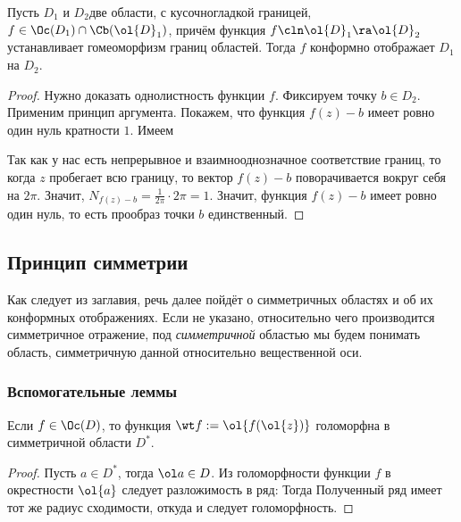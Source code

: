 \documentclass[a4paper]{article}
\begin{document}
\begin{theorem}
Пусть $D_1$ и $D_2$\т две области, с кусочно\д гладкой границей, $f\in\Oc(D_1) \cap \Cb(\ol{D}_1)$,
причём функция $f\cln \ol{D}_1\ra \ol{D}_2$ устанавливает гомеоморфизм границ областей.
Тогда $f$ конформно отображает $D_1$ на $D_2$.
\end{theorem}
\begin{proof}
Нужно доказать однолистность функции $f$. Фиксируем точку $b \in D_2$.
Применим принцип аргумента. Покажем, что функция $f(z)-b$ имеет ровно один нуль кратности $1$. Имеем


Так как у нас есть непрерывное и взаимно\д однозначное соответствие границ, то когда $z$ пробегает всю границу, то
вектор $f(z)-b$ поворачивается вокруг себя на $2\pi$. Значит, $N_{f(z)-b} = \frac{1}{2\pi} \cdot2\pi =1$.
Значит, функция $f(z)-b$ имеет ровно один нуль, то есть прообраз точки $b$ единственный.
\end{proof}

\subsection{Принцип симметрии}

Как следует из заглавия, речь далее пойдёт о симметричных областях и об их конформных отображениях.
Если не указано, относительно чего производится симметричное отражение, под \emph{симметричной}
областью мы будем понимать область, симметричную данной относительно вещественной оси.

\subsubsection{Вспомогательные леммы}

\begin{lemma}
Если $f\in\Oc(D)$, то функция $\wt f := \ol{f(\ol{z})}$ голоморфна в симметричной области $D^*$.
\end{lemma}
\begin{proof}
Пусть $a \in D^*$, тогда $\ol a \in D$. Из голоморфности функции $f$ в окрестности $\ol{a}$ следует
разложимость в ряд:
Тогда
Полученный ряд имеет тот же радиус сходимости, откуда и следует голоморфность.
\end{proof}
\end{document}
